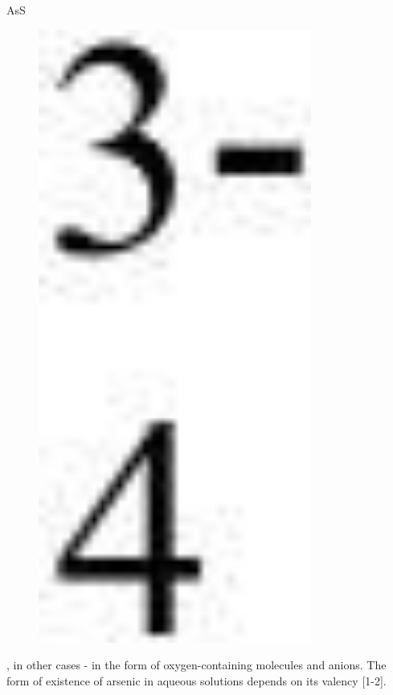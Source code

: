 AsS\begin{figure}[H]
	\centering
	\includegraphics[width=0.8\textwidth]{assets/328}
	\caption*{}
\end{figure}, in other cases - in the form of
oxygen-containing molecules and anions. The form of existence of arsenic
in aqueous solutions depends on its valency {[}1-2{]}.

